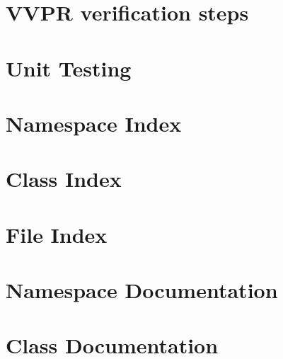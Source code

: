 \let\mypdfximage\pdfximage\def\pdfximage{\immediate\mypdfximage}\documentclass[twoside]{book}
\newcommand{\+}{\discretionary{\mbox{\scriptsize$\hookleftarrow$}}{}{}}
\begin{document}
\chapter{V\+V\+PR verification steps}
\label{md_src_protocol_verif_vvprcheck__r_e_a_d_m_e}

\chapter{Unit Testing}
\label{md_testing__r_e_a_d_m_e}

\chapter{Namespace Index}

\chapter{Class Index}

\chapter{File Index}

\chapter{Namespace Documentation}




\chapter{Class Documentation}








\end{document}
